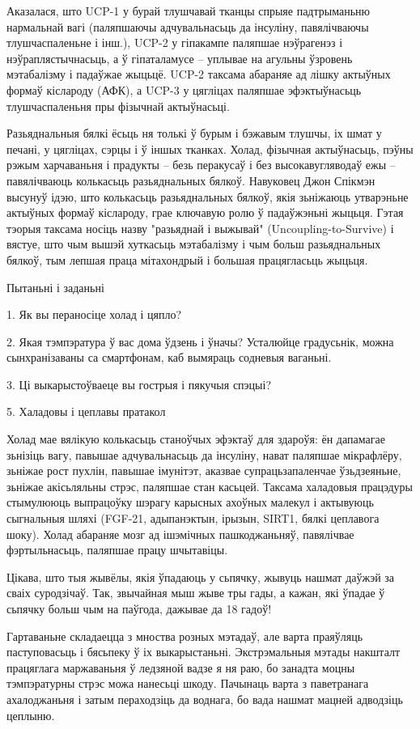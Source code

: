Аказалася, што UCP-1 у бурай тлушчавай тканцы спрыяе падтрыманьню нармальнай вагі (паляпшаючы адчувальнасьць да інсуліну, павялічваючы тлушчаспаленьне і інш.), UCP-2 у гіпакампе паляпшае нэўрагенэз і нэўраплястычнасьць, а ў гіпаталамусе – уплывае на агульны ўзровень мэтабалізму і падаўжае жыцьцё. UCP-2 таксама абараняе ад лішку актыўных формаў кіслароду (АФК), а UCP-3 у цягліцах паляпшае эфэктыўнасьць тлушчаспаленьня пры фізычнай актыўнасьці.

Разьяднальныя бялкі ёсьць ня толькі ў бурым і бэжавым тлушчы, іх шмат у печані, у цягліцах, сэрцы і ў іншых тканках. Холад, фізычная актыўнасьць, пэўны рэжым харчаваньня і прадукты – безь перакусаў і без высокавугляводаў ежы – павялічваюць колькасьць разьяднальных бялкоў. Навуковец Джон Спікмэн высунуў ідэю, што колькасьць разьяднальных бялкоў, якія зьніжаюць утварэньне актыўных формаў кіслароду, грае ключавую ролю ў падаўжэньні жыцьця. Гэтая тэорыя таксама носіць назву "разьяднай і выжывай" (Uncoupling-to-Survive) і вястуе, што чым вышэй хуткасьць мэтабалізму і чым больш разьяднальных бялкоў, тым лепшая праца мітахондрый і большая працягласьць жыцьця.

Пытаньні і заданьні

1. Як вы пераносіце холад і цяпло?

2. Якая тэмпэратура ў вас дома ўдзень і ўначы? Усталюйце градусьнік, можна сынхранізаваны са смартфонам, каб вымяраць содневыя ваганьні.

3. Ці выкарыстоўваеце вы гострыя і пякучыя спэцыі?


5. Халадовы і цеплавы пратакол

Холад мае вялікую колькасьць станоўчых эфэктаў для здароўя: ён дапамагае зьнізіць вагу, павышае адчувальнасьць да інсуліну, нават паляпшае мікрафлёру, зьніжае рост пухлін, павышае імунітэт, аказвае супрацьзапаленчае ўзьдзеяньне, зьніжае акісьляльны стрэс, паляпшае стан касьцей. Таксама халадовыя працэдуры стымулююць выпрацоўку шэрагу карысных ахоўных малекул і актывуюць сыгнальныя шляхі (FGF-21, адыпанэктын, ірызын, SIRT1, бялкі цеплавога шоку). Холад абараняе мозг ад ішэмічных пашкоджаньняў, павялічвае фэртыльнасьць, паляпшае працу шчытавіцы.

Цікава, што тыя жывёлы, якія ўпадаюць у сьпячку, жывуць нашмат даўжэй за сваіх суродзічаў. Так, звычайная мыш жыве тры гады, а кажан, які ўпадае ў сьпячку больш чым на паўгода, дажывае да 18 гадоў!

Гартаваньне складаецца з мноства розных мэтадаў, але варта праяўляць паступовасьць і бясьпеку ў іх выкарыстаньні. Экстрэмальныя мэтады накшталт працяглага маржаваньня ў ледзяной вадзе я ня раю, бо занадта моцны тэмпэратурны стрэс можа нанесьці шкоду. Пачынаць варта з паветранага ахалоджаньня і затым пераходзіць да воднага, бо вада нашмат мацней адводзіць цеплыню.

